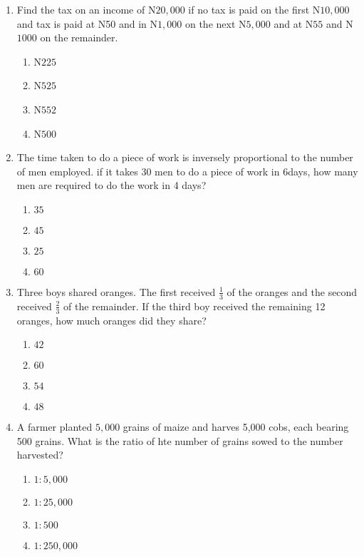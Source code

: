 \begin{multicols}{2}
\begin{enumerate}[label={\arabic*.}]
\begin{enumerate}[label={\Alph*.}]
    \end{enumerate}
\item Find the tax on an income of N\(20,000\) if no tax is paid on the first N\(10,000\) and tax is paid at N50 and in N\(1,000\)
on the next N\(5,000\) and at N\(55\) and N\(1000\) on the remainder. 
    \begin{enumerate}[label={\Alph*.}]
    \item N\(225\)
    \item N\(525\)
    \item N\(552\)
    \item N\(500\)
    

    \end{enumerate}
\item The time taken to do a piece of work is inversely proportional to the number of men employed. 
if it takes 30 men to do a piece of work in 6days, how many men are required to do the work in 4 days?
    \begin{enumerate}[label={\Alph*.}]
    \item \(35\)
    \item \(45\)
    \item \(25\)
    \item \(60\)

    \end{enumerate}
\item Three boys shared oranges. The first received \(\frac{1}{3}\) of the oranges and the second received \(\frac{2}{3}\)
of the remainder. If the third boy received the remaining 12 oranges, how much oranges did they share?
    \begin{enumerate}[label={\Alph*.}]
    \item \(42\)
    \item \(60\)
    \item \(54\)
    \item \(48\)

    \end{enumerate}
\item A farmer planted \(5,000\) grains of maize and harves 5,000 cobs, each bearing 500 grains. What is the ratio of hte number of grains sowed 
to the number harvested? 
    \begin{enumerate}[label={\Alph*.}]
    \item \(1:5,000\)
    \item \(1:25,000\)
    \item \(1:500\)
    \item \(1:250,000\)


\end{enumerate}
\end{enumerate}
\end{multicols}
